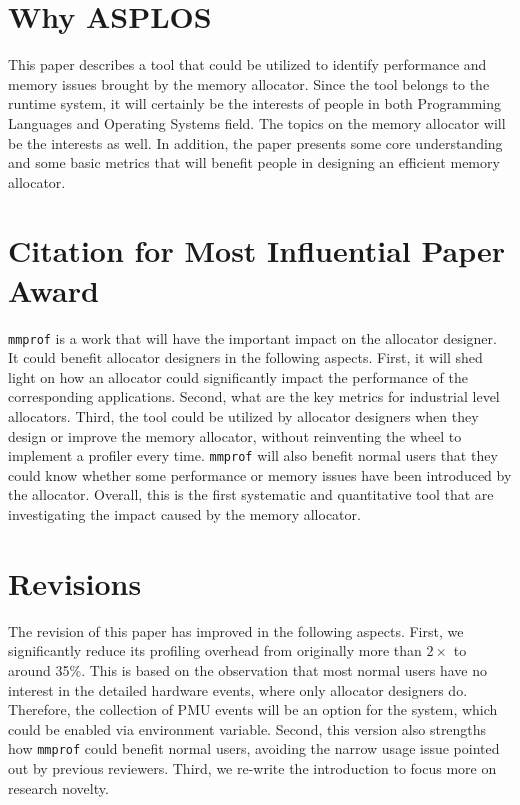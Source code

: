 \documentclass[pageno]{jpaper}
\newcommand{\MP}{\texttt{mmprof}}
\begin{document}
\section{Why ASPLOS}
\label{sec:why-asplos}

This paper describes a tool that could be utilized to identify performance and memory issues brought by the memory allocator. Since the tool belongs to the runtime system, it will certainly be the interests of people in both Programming Languages and Operating Systems field. The topics on the memory allocator will be the interests as well. In addition, the paper presents some core understanding and some basic metrics that will benefit people in designing an efficient memory allocator.

\section{Citation for Most Influential Paper Award}
\label{sec:citation}

\MP{} is a work that will have the important impact on the allocator designer. It could benefit allocator designers in the following aspects. First, it will shed light on how an allocator could significantly impact the performance of the corresponding applications. Second, what are the key metrics for industrial level allocators. Third, the tool could be utilized by allocator designers when they design or improve the memory allocator, without reinventing the wheel to implement a profiler every time. \MP{} will also benefit normal users that they could know whether some performance or memory issues have been introduced by the allocator. Overall, this is the first systematic and quantitative tool that are investigating the impact caused by the memory allocator. 

\section{Revisions}
\label{sec:revisions}

The revision of this paper has improved in the following aspects. First, we significantly reduce its profiling overhead from originally more than $2\times$ to around 35\%. This is based on the observation that most normal users have no interest in the detailed hardware events, where only allocator designers do. Therefore, the collection of PMU events will be an option for the system, which could be enabled via environment variable. Second, this version also strengths how \MP{} could benefit normal users, avoiding the narrow usage issue pointed out by previous reviewers. Third, we re-write the introduction to focus more on research novelty. 
 
\pagebreak
{


}
\end{document}
